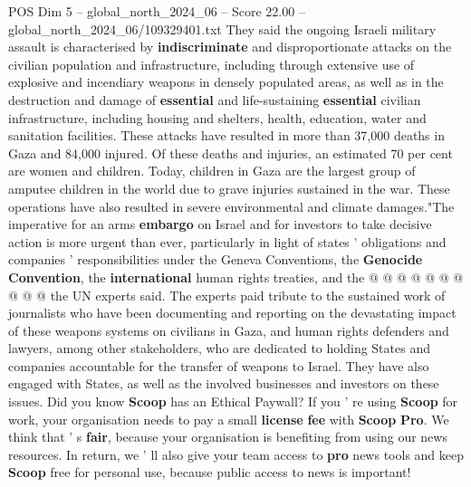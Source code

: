 \begin{textsample}{POS Dim 5 – global\_north\_2024\_06 – Score 22.00 – global\_north\_2024\_06/109329401.txt}
They said the ongoing Israeli military assault is characterised by \textbf{indiscriminate} and disproportionate attacks on the civilian population and infrastructure, including through extensive use of explosive and incendiary weapons in densely populated areas, as well as in the destruction and damage of \textbf{essential} and life-sustaining \textbf{essential} civilian infrastructure, including housing and shelters, health, education, water and sanitation facilities.
These attacks have resulted in more than 37,000 deaths in Gaza and 84,000 injured.
Of these deaths and injuries, an estimated 70 per cent are women and children.
Today, children in Gaza are the largest group of amputee children in the world due to grave injuries sustained in the war.
These operations have also resulted in severe environmental and climate damages."The imperative for an arms \textbf{embargo} on Israel and for investors to take decisive action is more urgent than ever, particularly in light of states ' obligations and companies ' responsibilities under the Geneva Conventions, the \textbf{Genocide} \textbf{Convention}, the \textbf{international} human rights treaties, and the @ @ @ @ @ @ @ @ @ @ the UN experts said.
The experts paid tribute to the sustained work of journalists who have been documenting and reporting on the devastating impact of these weapons systems on civilians in Gaza, and human rights defenders and lawyers, among other stakeholders, who are dedicated to holding States and companies accountable for the transfer of weapons to Israel.
They have also engaged with States, as well as the involved businesses and investors on these issues.
Did you know \textbf{Scoop} has an Ethical Paywall?
If you ' re using \textbf{Scoop} for work, your organisation needs to pay a small \textbf{license} \textbf{fee} with \textbf{Scoop} \textbf{Pro}.
We think that ' s \textbf{fair}, because your organisation is benefiting from using our news resources.
In return, we ' ll also give your team access to \textbf{pro} news tools and keep \textbf{Scoop} free for personal use, because public access to news is important!

\end{textsample}
